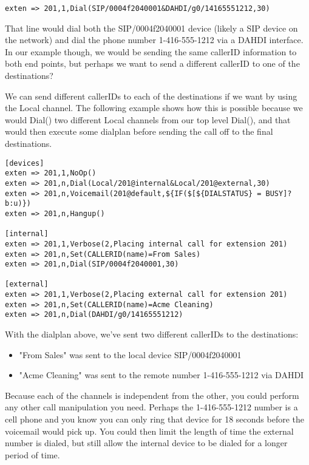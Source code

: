 \begin{astlisting}
\begin{verbatim}
exten => 201,1,Dial(SIP/0004f2040001&DAHDI/g0/14165551212,30)
\end{verbatim}
\end{astlisting}

That line would dial both the SIP/0004f2040001 device (likely a SIP device on
the network) and dial the phone number 1-416-555-1212 via a DAHDI interface. In
our example though, we would be sending the same callerID information to both
end points, but perhaps we want to send a different callerID to one of the
destinations?

We can send different callerIDs to each of the destinations if we want by using
the Local channel. The following example shows how this is possible because we
would Dial() two different Local channels from our top level Dial(), and that
would then execute some dialplan before sending the call off to the final
destinations.

\begin{astlisting}
\begin{verbatim}
[devices]
exten => 201,1,NoOp()
exten => 201,n,Dial(Local/201@internal&Local/201@external,30)
exten => 201,n,Voicemail(201@default,${IF($[${DIALSTATUS} = BUSY]?b:u)})
exten => 201,n,Hangup()

[internal]
exten => 201,1,Verbose(2,Placing internal call for extension 201)
exten => 201,n,Set(CALLERID(name)=From Sales)
exten => 201,n,Dial(SIP/0004f2040001,30)

[external]
exten => 201,1,Verbose(2,Placing external call for extension 201)
exten => 201,n,Set(CALLERID(name)=Acme Cleaning)
exten => 201,n,Dial(DAHDI/g0/14165551212)
\end{verbatim}
\end{astlisting}

With the dialplan above, we've sent two different callerIDs to the destinations:

\begin{itemize}
\item "From Sales" was sent to the local device SIP/0004f2040001
\item "Acme Cleaning" was sent to the remote number 1-416-555-1212 via DAHDI
\end{itemize}

Because each of the channels is independent from the other, you could perform
any other call manipulation you need. Perhaps the 1-416-555-1212 number is a
cell phone and you know you can only ring that device for 18 seconds before the
voicemail would pick up. You could then limit the length of time the external
number is dialed, but still allow the internal device to be dialed for a longer
period of time.

